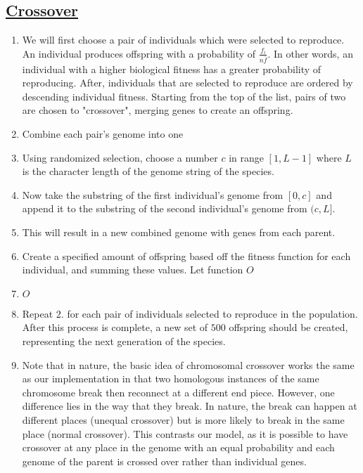 \newpage
\subsection{\underline{Crossover}}
\begin{enumerate}
\item We will first choose a pair of individuals which were selected to reproduce. An individual produces offspring with a probability of $\frac{f_i}{n\bar{f}}$. In other words, an individual with a higher biological fitness has a greater probability of reproducing. After, individuals that are selected to reproduce are ordered by descending individual fitness. Starting from the top of the list, pairs of two are chosen to "crossover", merging genes to create an offspring. 
\item Combine each pair's genome into one
\bi
\item Using randomized selection, choose a number $c$ in range $[1,L-1]$ where $L$ is the character length of the genome string of the species.
\item Now take the substring of the first individual's genome from $[0, c]$ and append it to the substring of the second individual's genome from $(c, L]$. 
\item This will result in a new combined genome with genes from each parent.
\item Create a specified amount of offspring based off the fitness function for each individual, and summing these values. Let function $O$
\item $O$
\ei
\item Repeat $2.$ for each pair of individuals selected to reproduce in the population. After this process is complete, a new set of $500$ offspring should be created, representing the next generation of the species. 
\item Note that in nature, the basic idea of chromosomal crossover works 
the same as our implementation in that two homologous instances of the same
chromosome break then reconnect at a different end piece. However, one 
difference lies in the way that they break. In nature, the break can happen
at different places (unequal crossover) but is more likely to break in the
same place (normal crossover). This contrasts our model, as it is possible
to have crossover at any place in the genome with an equal probability
and each genome of the parent is crossed over rather than individual genes.
\end{enumerate}